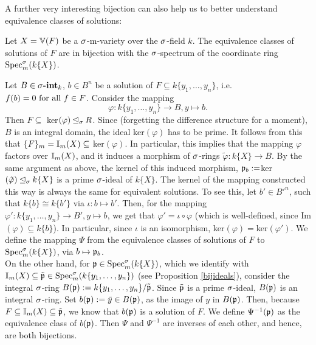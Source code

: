 A further very interesting bijection can also help us to better understand equivalence classes of solutions: 
\begin{prop}\label{bijsols}
Let $X = \mathbb{V}(F)$ be a $\sigma$-m-variety over the $\sigma$-field $k$. The equivalence classes of solutions of $F$ are in bijection with the $\sigma$-spectrum of the coordinate ring $\operatorname{Spec}^\sigma_m(k\{X\})$.
\begin{bew}
Let $B \in \sigma\text{{\normalfont\textbf{-int}}}_k$, $b \in B^n$ be a solution of $F \subseteq k\{y_1,\ldots,y_n\}$, i.e. $f(b) = 0 \text{ for all } f \in F$. Consider the mapping $$\varphi: k\{y_1,\ldots,y_n\} \rightarrow B, y \mapsto b.$$
Then $F \subseteq $ ker$( \varphi) \unlhd_{\sigma} R$.
Since (forgetting the difference structure for a moment), $B$ is an integral domain, the ideal ker$(\varphi)$ has to be prime. It follows from this that $\{F\}_m = \mathbb{I}_m(X) \subseteq~$ker$(\varphi)$. 
In particular, this implies that the mapping $\varphi$ factors over $\mathbb{I}_m(X)$, and it induces a morphism of $\sigma$-rings $\tilde \varphi: k\{X\} \rightarrow B$. By the same argument as above, the kernel of this induced
morphism, $\mathfrak{p}_b := $ker$(\tilde \varphi) \unlhd_{\sigma} k\{X\}$ is a prime $\sigma$-ideal of $k\{X\}$. The kernel of the mapping constructed this way is always the same for equivalent solutions. To see this, let $b' \in B'^n$, such that $k\{b\} \cong k\{b'\}$ via $\iota: b \mapsto b'$.
Then, for the mapping $\varphi': k\{y_1, \ldots, y_n\} \rightarrow B', y \mapsto b$, we get that $\varphi' = \iota \circ \varphi$ (which is well-defined, since Im$(\varphi)\subseteq k\{b\}$). In particular, since $\iota$ is an isomorphism, ker$(\varphi) = $ker$(\varphi')$. 
We define the mapping $\Psi$ from the equivalence classes of solutions of $F$ to $\operatorname{Spec}^\sigma_m(k\{X\})$, via $b \mapsto \mathfrak{p}_b$.\\ 

\indent On the other hand, for $\mathfrak{p} \in \operatorname{Spec}^\sigma_m(k\{X\})$, which we identify with \\$\mathbb{I}_m(X) \subseteq \tilde {\mathfrak{p}} \in \operatorname{Spec}^\sigma_m(k\{y_1,\ldots,y_n\})$ (see Proposition \ref{bijideals}), consider the integral $\sigma$-ring $B(\mathfrak{p}):= k\{y_1,\ldots,y_n\}/ \tilde {\mathfrak{p}}$.
Since $\tilde {\mathfrak{p}}$ is a prime $\sigma$-ideal, $B(\mathfrak{p})$ is an integral $\sigma$-ring. Set $b(\mathfrak{p}) := \bar y \in B(\mathfrak{p})$, as the image of $y$ in $B(\mathfrak{p})$. Then, because $F \subseteq \mathbb{I}_m(X) \subseteq \tilde {\mathfrak{p}}$, we know that $b(\mathfrak{p})$ is a solution of $F$. 
We define $\Psi^{-1}(\mathfrak{p})$ as the equivalence class of $b(\mathfrak{p})$. Then $\Psi$ and $\Psi^{-1}$ are inverses of each other, and hence, are both bijections.
\end{bew}
\end{prop}

